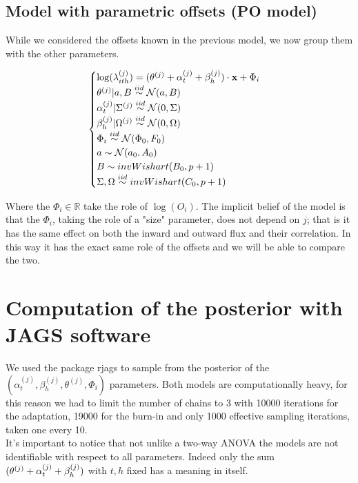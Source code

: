 \documentclass[11pt,twoside]{report}
\begin{document}
\subsection{Model with parametric offsets (PO model)}
While we considered the offsets known in the previous model, we now group them with the other parameters.

\begin{equation}
\begin{cases}
\log(\lambda^{(j)}_{ith}) = (\boldmath{\theta^{(j)} +  \alpha^{(j)}_{t} + \beta_{h}^{(j)})}\cdot\mathbf{x} + \Phi_i\\
\theta^{(j)}|a,B \stackrel{iid}{\sim} \mathcal{N}(a,B)\\
\alpha_{t}^{(j)}|\Sigma^{(j)} \stackrel{iid}{\sim} \mathcal{N}(0, \Sigma)\\
\beta_{h}^{(j)}|\Omega^{(j)} \stackrel{iid}{\sim} \mathcal{N}(0, \Omega)\\
\Phi_i \stackrel{iid}{\sim} \mathcal{N}(\Phi_0, F_0)\\
a \sim \mathcal{N}(a_0, A_0)\\
B \sim invWishart(B_0, p+1)\\
\Sigma, \Omega \stackrel{iid}{\sim} invWishart(C_0, p+1)

\end{cases}
\end{equation}

Where the $\Phi_i \in \mathbb{R}$ take the role of $\log(O_i)$. The implicit belief of the model is that the $\Phi_i$, taking the role of a "size" parameter, does not depend on $j$; that is it has the same effect on both the inward and outward flux and their correlation. In this way it has the exact same role of the offsets and we will be able to compare the two.

\section{Computation of the posterior with JAGS software}
We used the package rjags to sample from the posterior of the $(\alpha_{t}^{(j)}, \beta_{h}^{(j)}, \theta^{(j)}, \Phi_i)$ parameters. Both models are computationally heavy, for this reason we had to limit the number of chains to 3 with 10000 iterations for the adaptation, 19000 for the burn-in and only 1000 effective sampling iterations, taken one every 10.\\

It's important to notice that not unlike a two-way ANOVA the models are not identifiable with respect to all parameters. Indeed only the sum $(\boldmath{\theta^{(j)} +  \alpha^{(j)}_{t} + \beta_{h}^{(j)})}$ with $t,h$ fixed has a meaning in itself. 
\end{document}
